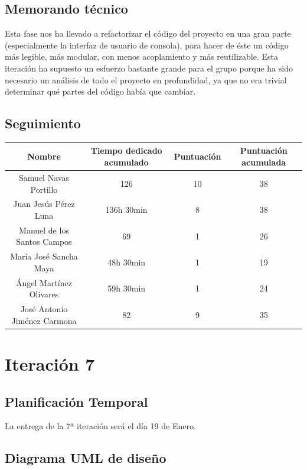 \documentclass[11 pt]{book}
\begin{document}
	\section{Memorando técnico}
		Esta fase nos ha llevado a refactorizar el código del proyecto en una gran parte (especialmente la interfaz de usuario de consola), para hacer de éste un código más legible, más modular, con menos acoplamiento y más reutilizable. Esta iteración ha supuesto un esfuerzo bastante grande para el grupo porque ha sido necesario un análisis de todo el proyecto en profundidad, ya que no era trivial determinar qué partes del código había que cambiar.
		
	\section{Seguimiento}
		\begin{tabular}{|c|c|c|c|}
			\hline
			Nombre & Tiempo dedicado acumulado & Puntuación & Puntuación acumulada\\
			\hline
			Samuel Navas Portillo & 126 & 10 & 38\\
			Juan Jesús Pérez Luna & 136h 30min & 8 & 38\\
			Manuel de los Santos Campos & 69 & 1 & 26\\
			María José Sancha Maya & 48h 30min & 1 & 19\\
			Ángel Martínez Olivares & 59h 30min & 1 & 24\\
			José Antonio Jiménez Carmona & 82 & 9 & 35\\
			\hline
		\end{tabular}

\chapter{Iteración 7}
	\section{Planificación Temporal}
		La entrega de la 7ª iteración será el día 19 de Enero.
	
	\section{Diagrama UML de diseño}
	
\end{document}
